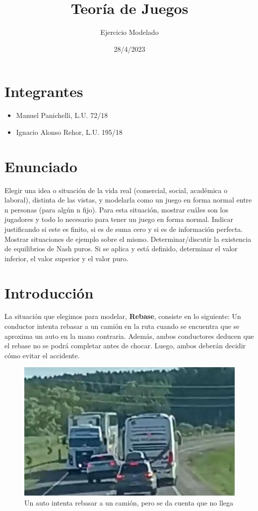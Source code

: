 \documentclass{article}
\title{Teoría de Juegos}
\author{Ejercicio Modelado}
\date{28/4/2023}
\begin{document}
\maketitle

\section*{Integrantes}

\begin{itemize}
    \item Manuel Panichelli, L.U. 72/18
    \item Ignacio Alonso Rehor, L.U. 195/18
\end{itemize}

\section*{Enunciado}

Elegir una idea o situación de la vida real (comercial, social, académica o laboral), distinta de las vistas, y modelarla como un juego en forma normal entre n personas (para algún n fijo). Para esta situación, mostrar cuáles son los jugadores y todo lo necesario para tener un juego en forma normal. Indicar justificando si este es finito, si es de suma cero y si es de información perfecta. Mostrar situaciones de ejemplo sobre el mismo. Determinar/discutir la existencia de equilibrios de Nash puros. Si se aplica y está definido, determinar el valor inferior, el valor superior y el valor puro.

\section*{Introducción}

La situación que elegimos para modelar, \textbf{Rebase}, consiste en lo siguiente: Un conductor intenta rebasar a un camión en la ruta cuando se encuentra que se aproxima un auto en la mano contraria. Además, ambos conductores deducen que el rebase no se podrá completar antes de chocar. Luego, ambos deberán decidir cómo evitar el accidente.

\begin{figure}[H]
    \centering
    \includegraphics[scale=0.5]{rebase.png}
    \caption{Un auto intenta rebasar a un camión, pero se da cuenta que no llega}
\end{figure}
\end{document}

